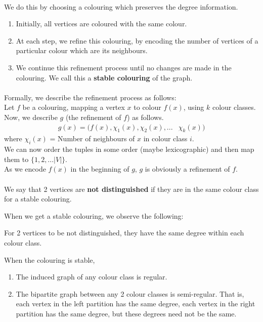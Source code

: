 \paragraph*{}
We do this by choosing a colouring which preserves the degree information. 
\begin{enumerate}
\item Initially, all vertices are coloured with the same colour.
\item At each step, we refine this colouring, by encoding the number of vertices of a particular colour which are its neighbours. 
\item We continue this refinement process until no changes are made in the colouring. We call this a \textbf{stable colouring} of the graph.
\end{enumerate}
\paragraph*{}
Formally, we describe the refinement process as follows:\\
Let $f$ be a colouring, mapping a vertex $x$ to colour $f(x)$, using $k$ colour classes. Now, we describe $g$ (the refinement of $f$) as follows.
\begin{eqnarray*}
g(x) = (f(x), \chi_1(x), \chi_2(x), ... & \chi_k(x))
\end{eqnarray*}
where $\chi_i(x)$ = Number of neighbours of $x$ in colour class $i$.\\  
We can now order the tuples in some order (maybe lexicographic) and then map them to $\{1, 2, ... |V|\}$.\\
As we encode $f(x)$ in the beginning of $g$, $g$ is obviously a refinement of $f$.
\paragraph*{}
\begin{definition}
We say that 2 vertices are \textbf{not distinguished} if they are in the same colour class for a stable colouring.
\end{definition}
When we get a stable colouring, we observe the following:
\begin{observation}
For 2 vertices to be not distinguished, they have the same degree within each colour class. 
\end{observation}
\begin{observation}
When the colouring is stable, 
\begin{enumerate}
\item The induced graph of any colour class is regular.
\item The bipartite graph between any 2 colour classes is semi-regular. That is, each vertex in the left partition has the same degree, each vertex in the right partition has the same degree, but these degrees need not be the same.
\end{enumerate} 
\end{observation}

